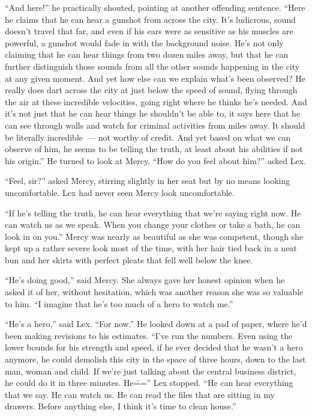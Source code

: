 \documentclass[ebook,12pt]{memoir}
\begin{document}
``And here!'' he practically shouted, pointing at another offending
sentence. ``Here he claims that he can hear a gunshot from across the
city. It's ludicrous, sound doesn't travel that far, and even if his
ears were as sensitive as his muscles are powerful, a gunshot would fade
in with the background noise. He's not only claiming that he can hear
things from two dozen miles away, but that he can further distinguish
those sounds from all the other sounds happening in the city at any
given moment. And yet how else can we explain what's been observed? He
really does dart across the city at just below the speed of sound,
flying through the air at these incredible velocities, going right where
he thinks he's needed. And it's not just that he can hear things he
shouldn't be able to, it says here that he can see through walls and
watch for criminal activities from miles away. It should be literally
incredible~--- not worthy of credit. And yet based on what we can
observe of him, he seems to be telling the truth, at least about his
abilities if not his origin.'' He turned to look at Mercy. ``How do you
feel about him?'' asked Lex.

``Feel, sir?'' asked Mercy, stirring slightly in her seat but by no
means looking uncomfortable. Lex had never seen Mercy look
uncomfortable.

``If he's telling the truth, he can hear everything that we're saying
right now. He can watch us as we speak. When you change your clothes or
take a bath, he can look in on you.'' Mercy was nearly as beautiful as
she was competent, though she kept up a rather severe look most of the
time, with her hair tied back in a neat bun and her skirts with perfect
pleats that fell well below the knee.

``He's doing good,'' said Mercy. She always gave her honest opinion when
he asked it of her, without hesitation, which was another reason she was
so valuable to him. ``I imagine that he's too much of a hero to watch
me.''

``He's a hero,'' said Lex. ``For now.'' He looked down at a pad of
paper, where he'd been making revisions to his estimates. ``I've run the
numbers. Even using the lower bounds for his strength and speed, if he
ever decided that he wasn't a hero anymore, he could demolish this city
in the space of three hours, down to the last man, woman and child. If
we're just talking about the central business district, he could do it
in three minutes. He\==='' Lex stopped. ``He can hear everything that we
say. He can watch us. He can read the files that are sitting in my
drawers. Before anything else, I think it's time to clean house.''
\end{document}
